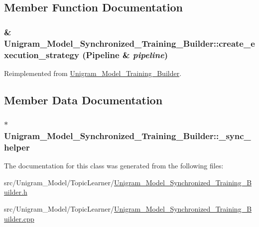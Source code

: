 \subsection{Member Function Documentation}
\hypertarget{class_unigram___model___synchronized___training___builder_a756ac51fbf24f5c0381dfe402ee53ef0}{
\subsubsection[{create\_\-execution\_\-strategy}]{ \& Unigram\_\-Model\_\-Synchronized\_\-Training\_\-Builder::create\_\-execution\_\-strategy ({\bf Pipeline} \& {\em pipeline})}}
\label{class_unigram___model___synchronized___training___builder_a756ac51fbf24f5c0381dfe402ee53ef0}


Reimplemented from \hyperlink{class_unigram___model___training___builder_a7115521792cd0262b3bf99de8474420d}{Unigram\_\-Model\_\-Training\_\-Builder}.



\subsection{Member Data Documentation}
\hypertarget{class_unigram___model___synchronized___training___builder_ae77faaafd77e4278deb69b811d3bfba9}{
\subsubsection[{\_\-sync\_\-helper}]{$\ast$ {\bf Unigram\_\-Model\_\-Synchronized\_\-Training\_\-Builder::\_\-sync\_\-helper}}}
\label{class_unigram___model___synchronized___training___builder_ae77faaafd77e4278deb69b811d3bfba9}


The documentation for this class was generated from the following files:\begin{DoxyCompactItemize}
\item 
src/Unigram\_\-Model/TopicLearner/\hyperlink{_unigram___model___synchronized___training___builder_8h}{Unigram\_\-Model\_\-Synchronized\_\-Training\_\-Builder.h}\item 
src/Unigram\_\-Model/TopicLearner/\hyperlink{_unigram___model___synchronized___training___builder_8cpp}{Unigram\_\-Model\_\-Synchronized\_\-Training\_\-Builder.cpp}\end{DoxyCompactItemize}
